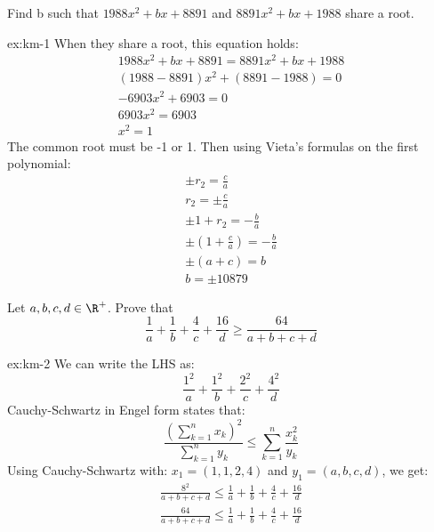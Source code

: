 \begin{exercise}\label{ex:km-1}
  Find b such that $1988x^2+bx+8891$ and $8891x^2+bx+1988$ share a root.
\end{exercise}
\begin{solution}{ex:km-1}
  When they share a root, this equation holds:
  \[
    \begin{gathered}
      1988x^2+bx+8891=8891x^2+bx+1988\\
      (1988-8891)x^2+(8891-1988)=0\\
      -6903x^2+6903=0\\
      6903x^2=6903\\
      x^2=1
    \end{gathered}
  \]
  The common root must be -1 or 1. Then using Vieta's formulas on the first polynomial:
  \[
    \begin{gathered}
      \pm r_2= \frac{c}{a}\\
      r_2 = \pm \frac{c}{a}\\
      \pm 1 + r_2 = -\frac{b}{a}\\
      \pm (1+\frac{c}{a})=-\frac{b}{a}\\
      \pm (a+c)=b\\
      b=\pm 10879
    \end{gathered}
  \]
\end{solution}
\begin{exercise}\label{ex:km-2}
  Let $a,b,c,d\in \R^+$. Prove that
  \[
    \frac{1}{a}+\frac{1}{b}+\frac{4}{c}+\frac{16}{d}\geq \frac{64}{a+b+c+d}
  \]
\end{exercise}
\begin{solution}{ex:km-2}
  We can write the LHS as:
  \[
    \frac{1^2}{a}+\frac{1^2}{b}+\frac{2^2}{c}+\frac{4^2}{d}
  \]
  Cauchy-Schwartz in Engel form states that:
  \[
    \frac{(\sum_{k=1}^{n}x_k)^2}{\sum_{k=1}^{n}y_k}\leq \sum_{k=1}^{n}\frac{x_k^2}{y_k}
  \]
  Using Cauchy-Schwartz with: $x_1=(1,1,2,4)$ and $y_1=(a,b,c,d)$, we get:
  \[
    \begin{gathered}
      \frac{8^2}{a+b+c+d}\leq \frac{1}{a}+\frac{1}{b}+\frac{4}{c}+\frac{16}{d}\\
      \frac{64}{a+b+c+d}\leq \frac{1}{a}+\frac{1}{b}+\frac{4}{c}+\frac{16}{d}\\
    \end{gathered}
  \]
\end{solution}
